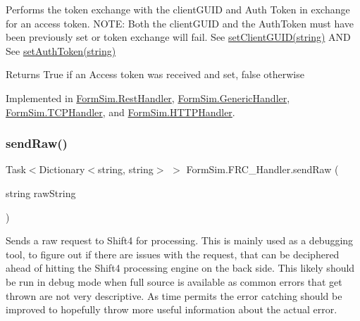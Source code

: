 Performs the token exchange with the client\+G\+U\+ID and Auth Token in exchange for an access token. N\+O\+TE\+: Both the client\+G\+U\+ID and the Auth\+Token must have been previously set or token exchange will fail. See \mbox{\hyperlink{interface_form_sim_1_1_f_r_c___handler_a3c77b2e99c98553928e463a9cbb5f7d4}{set\+Client\+G\+U\+I\+D(string)}} A\+ND See \mbox{\hyperlink{interface_form_sim_1_1_f_r_c___handler_a1314ea0937067435e3326818baa9d0c1}{set\+Auth\+Token(string)}} 

\begin{DoxyReturn}{Returns}
True if an Access token was received and set, false otherwise
\end{DoxyReturn}


Implemented in \mbox{\hyperlink{class_form_sim_1_1_rest_handler_abd5c425be2b6c9e30ca3cfc0fb696aa9}{Form\+Sim.\+Rest\+Handler}}, \mbox{\hyperlink{class_form_sim_1_1_generic_handler_a731bd7dada7e2d13fd9c9d768bd387ee}{Form\+Sim.\+Generic\+Handler}}, \mbox{\hyperlink{class_form_sim_1_1_t_c_p_handler_a61075c8a24b97ae7c86d357d6ee5a49e}{Form\+Sim.\+T\+C\+P\+Handler}}, and \mbox{\hyperlink{class_form_sim_1_1_h_t_t_p_handler_ae2ace13d7dc63f0bf1e1ef1a41bf8a3e}{Form\+Sim.\+H\+T\+T\+P\+Handler}}.

\mbox{\label{interface_form_sim_1_1_f_r_c___handler_a1f855ed4026632d00ac5fc6784c3bf0f}} 
\subsubsection{\texorpdfstring{send\+Raw()}{sendRaw()}\hspace{0.1cm}{\footnotesize\ttfamily [1/2]}}
{\footnotesize\ttfamily Task$<$Dictionary$<$string, string$>$ $>$ Form\+Sim.\+F\+R\+C\+\_\+\+Handler.\+send\+Raw (\begin{DoxyParamCaption}\item[{string}]{raw\+String }\end{DoxyParamCaption})}



Sends a raw request to Shift4 for processing. This is mainly used as a debugging tool, to figure out if there are issues with the request, that can be deciphered ahead of hitting the Shift4 processing engine on the back side. This likely should be run in debug mode when full source is available as common errors that get thrown are not very descriptive. As time permits the error catching should be improved to hopefully throw more useful information about the actual error. 


